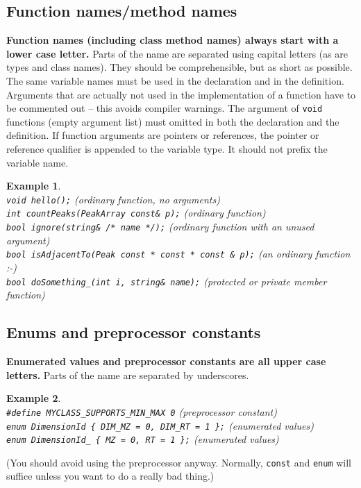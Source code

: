 \documentclass[a4]{article}
\newtheorem{example}{Example}
\begin{document}
\subsection{Function names/method names}

\textbf{Function names (including class method names) always start with a
  lower case letter.}  Parts of the name are separated using capital letters
(as are types and class names).  They should be comprehensible, but as short
as possible.  The same variable names must be used in the declaration and in
the definition.  Arguments that are actually not used in the implementation of
a function have to be commented out -- this avoids compiler warnings.  The
argument of \texttt{void} functions (empty argument list) must omitted in both
the declaration and the definition.  If function arguments are pointers or
references, the pointer or reference qualifier is appended to the variable
type. It should not prefix the variable name.
\begin{example}~\\
{\tt void hello();} (ordinary function, no arguments) \\
{\tt int countPeaks(PeakArray const\& p);} (ordinary function) \\
{\tt bool ignore(string\& /* name */);} (ordinary function with an unused argument) \\
{\tt bool isAdjacentTo(Peak const * const * const \& p);} (an ordinary function :-) \\
{\tt bool doSomething\_(int i, string\& name);} (protected or private member function)
\end{example}


\subsection{Enums and preprocessor constants}

\textbf{Enumerated values and preprocessor constants are all upper case
  letters.}  Parts of the name are separated by underscores.
\begin{example}~\\
  {\tt \#define MYCLASS\_SUPPORTS\_MIN\_MAX 0} (preprocessor constant) \\
  {\tt enum DimensionId \{ DIM\_MZ = 0, DIM\_RT = 1 \};} (enumerated values) \\
  {\tt enum DimensionId\_ \{ MZ = 0, RT = 1 \};} (enumerated values)
\end{example}
(You should avoid using the preprocessor anyway.  Normally, \texttt{const} and
\texttt{enum} will suffice unless you want to do a really bad thing.)
\end{document}
